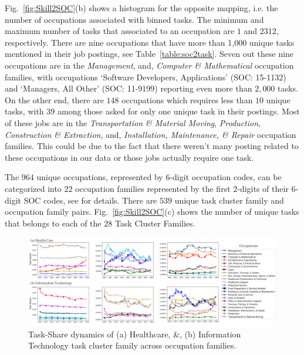 \documentclass[letterpaper]{article} %
\begin{document}
Fig.~\ref{fig:Skill2SOC}(b) shows a histogram for the opposite mapping, i.e. the number of occupations associated with binned tasks. The minimum and maximum number of tasks that associated to an occupation are $1$ and $2312$, respectively. There are nine occupations that have more than 1,000 unique tasks mentioned in their job postings, see Table~\ref{table:soc2task}. Seven out these nine occupations are in the {\it Management}, and, {\it Computer \& Mathematical} occupation families, with occupations `Software Developers, Applications' (SOC: 15-1132) and `Managers, All Other' (SOC: 11-9199) reporting even more than $2,000$ tasks. On the other end, there are $148$ occupations which requires less than $10$ unique tasks, with $39$ among those asked for only one unique task in their postings. Most of these jobs are in the {\it Transportation \& Material Moving}, {\it Production}, {\it Construction \& Extraction}, and, {\it Installation, Maintenance, \& Repair} occupation families. This could be due to the fact that there weren't many posting related to these occupations in our data or those jobs actually require one task.

The $964$ unique occupations, represented by 6-digit occupation codes, can be categorized into $22$ occupation families represented by the first 2-digits of their 6-digit SOC codes, see \cite{fleming2019future} for details. There are $539$ unique task cluster family and occupation family pairs. Fig.~\ref{fig:Skill2SOC}(c) shows the number of unique tasks that belongs to each of the $28$ Task Cluster Families.
\begin{figure}[t]
\centering
\includegraphics[width=0.95\linewidth]{combined_health_IT.png}
\caption{Task-Share dynamics of (a) Healthcare, \&, (b) Information Technology task cluster family across occupation families.}
\label{fig:SCF_health_IT}
\end{figure}
\end{document}
